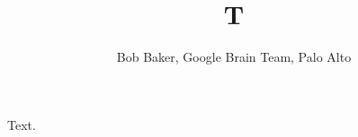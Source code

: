 \documentclass{article}
\begin{document}
\title{T}
\author{Bob Baker, Google Brain Team, Palo Alto}
\maketitle
Text.
\end{document}
